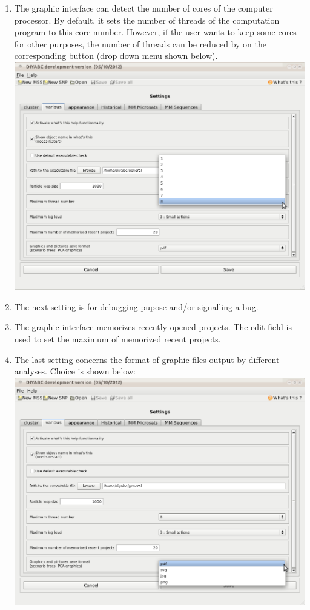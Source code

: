 \begin{enumerate}
 \item The graphic interface can detect the number of cores of the computer processor. By default, it sets the number of threads of the computation program to this core number. However, if the user wants to keep some cores for other purposes, the number of threads can be reduced by on the corresponding button (drop down menu shown below).\\
\includegraphics[scale=0.33]{gui_pictures/Capture-DIYABC-95.png} \\
 \item The next setting is for debugging pupose and/or signalling a bug.
 \item The graphic interface memorizes recently opened projects. The edit field is used to set the maximum of memorized recent projects.
 \item The last setting concerns the format of graphic files output by different analyses. Choice is shown below:\\
\includegraphics[scale=0.33]{gui_pictures/Capture-DIYABC-97.png} \\
   
\end{enumerate}

